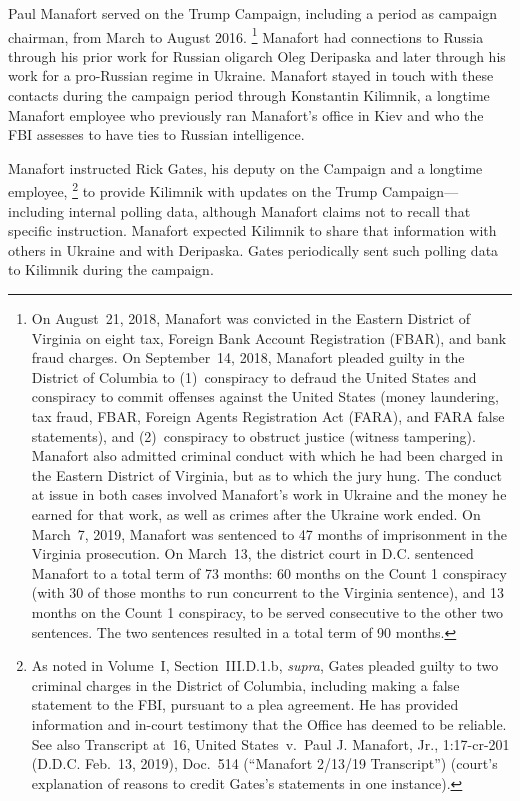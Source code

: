 Paul Manafort served on the Trump Campaign, including a period as campaign chairman, from March to August 2016.%
\footnote{On August~21, 2018, Manafort was convicted in the Eastern District of Virginia on eight tax, Foreign Bank Account Registration (FBAR), and bank fraud charges. On September~14, 2018, Manafort pleaded guilty in the District of Columbia to (1)~conspiracy to defraud the United States and conspiracy to commit offenses against the United States (money laundering, tax fraud, FBAR, Foreign Agents Registration Act (FARA), and FARA false statements), and (2)~conspiracy to obstruct justice (witness tampering).
Manafort also admitted criminal conduct with which he had been charged in the Eastern District of Virginia, but as to which the jury hung.
The conduct at issue in both cases involved Manafort's work in Ukraine and the money he earned for that work, as well as crimes after the Ukraine work ended. On March~7, 2019, Manafort was sentenced to 47 months of imprisonment in the Virginia prosecution.
On March~13, the district court in D.C. sentenced Manafort to a total term of 73 months: 60 months on the Count 1 conspiracy (with 30 of those months to run concurrent to the Virginia sentence), and 13 months on the Count 1 conspiracy, to be served consecutive to the other two sentences.
The two sentences resulted in a total term of 90 months.
}
Manafort had connections to Russia through his prior work for Russian oligarch Oleg Deripaska and later through his work for a pro-Russian regime in Ukraine.
Manafort stayed in touch with these contacts during the campaign period through Konstantin Kilimnik, a longtime Manafort employee who previously ran Manafort's office in Kiev and who the FBI assesses to have ties to Russian intelligence.

Manafort instructed Rick Gates, his deputy on the Campaign and a longtime employee,%
\footnote{As noted in Volume~I, Section~III.D.1.b, \textit{supra}, Gates pleaded guilty to two criminal charges in the District of Columbia, including making a false statement to the FBI, pursuant to a plea agreement.
He has provided information and in-court testimony that the Office has deemed to be reliable. See also Transcript at~16, United States~v.\ Paul J. Manafort, Jr., 1:17-cr-201 (D.D.C. Feb.~13, 2019), Doc.~514 (``Manafort 2/13/19 Transcript'') (court's explanation of reasons to credit Gates's statements in one instance).}
to provide Kilimnik with updates on the Trump Campaign---including internal polling data, although Manafort claims not to recall that specific instruction.
Manafort expected Kilimnik to share that information with others in Ukraine and with Deripaska.
Gates periodically sent such polling data to Kilimnik during the campaign.


